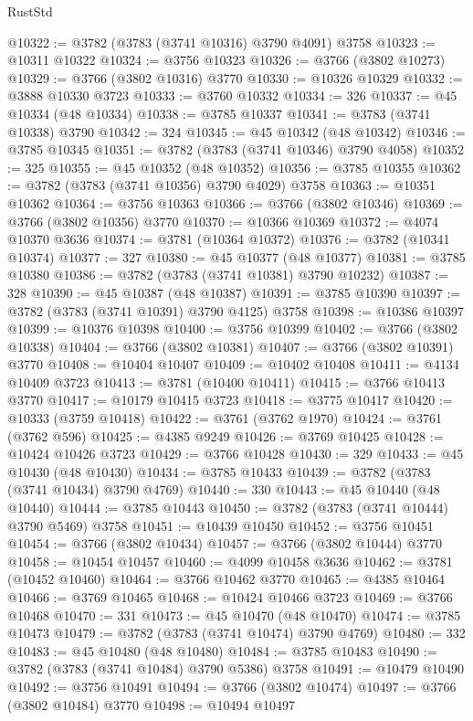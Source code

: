 \begin{lexlean}{RustStd}
\begin{coremodule}
@10322 := @3782 (@3783 (@3741 @10316) @3790 @4091) @3758
@10323 := @10311 @10322
@10324 := @3756 @10323
@10326 := @3766 (@3802 @10273)
@10329 := @3766 (@3802 @10316) @3770
@10330 := @10326 @10329
@10332 := @3888 @10330 @3723
@10333 := @3760 @10332
@10334 := 326
@10337 := @45 @10334 (@48 @10334)
@10338 := @3785 @10337
@10341 := @3783 (@3741 @10338) @3790
@10342 := 324
@10345 := @45 @10342 (@48 @10342)
@10346 := @3785 @10345
@10351 := @3782 (@3783 (@3741 @10346) @3790 @4058)
@10352 := 325
@10355 := @45 @10352 (@48 @10352)
@10356 := @3785 @10355
@10362 := @3782 (@3783 (@3741 @10356) @3790 @4029) @3758
@10363 := @10351 @10362
@10364 := @3756 @10363
@10366 := @3766 (@3802 @10346)
@10369 := @3766 (@3802 @10356) @3770
@10370 := @10366 @10369
@10372 := @4074 @10370 @3636
@10374 := @3781 (@10364 @10372)
@10376 := @3782 (@10341 @10374)
@10377 := 327
@10380 := @45 @10377 (@48 @10377)
@10381 := @3785 @10380
@10386 := @3782 (@3783 (@3741 @10381) @3790 @10232)
@10387 := 328
@10390 := @45 @10387 (@48 @10387)
@10391 := @3785 @10390
@10397 := @3782 (@3783 (@3741 @10391) @3790 @4125) @3758
@10398 := @10386 @10397
@10399 := @10376 @10398
@10400 := @3756 @10399
@10402 := @3766 (@3802 @10338)
@10404 := @3766 (@3802 @10381)
@10407 := @3766 (@3802 @10391) @3770
@10408 := @10404 @10407
@10409 := @10402 @10408
@10411 := @4134 @10409 @3723
@10413 := @3781 (@10400 @10411)
@10415 := @3766 @10413 @3770
@10417 := @10179 @10415 @3723
@10418 := @3775 @10417
@10420 := @10333 (@3759 @10418)
@10422 := @3761 (@3762 @1970)
@10424 := @3761 (@3762 @596)
@10425 := @4385 @9249
@10426 := @3769 @10425
@10428 := @10424 @10426 @3723
@10429 := @3766 @10428
@10430 := 329
@10433 := @45 @10430 (@48 @10430)
@10434 := @3785 @10433
@10439 := @3782 (@3783 (@3741 @10434) @3790 @4769)
@10440 := 330
@10443 := @45 @10440 (@48 @10440)
@10444 := @3785 @10443
@10450 := @3782 (@3783 (@3741 @10444) @3790 @5469) @3758
@10451 := @10439 @10450
@10452 := @3756 @10451
@10454 := @3766 (@3802 @10434)
@10457 := @3766 (@3802 @10444) @3770
@10458 := @10454 @10457
@10460 := @4099 @10458 @3636
@10462 := @3781 (@10452 @10460)
@10464 := @3766 @10462 @3770
@10465 := @4385 @10464
@10466 := @3769 @10465
@10468 := @10424 @10466 @3723
@10469 := @3766 @10468
@10470 := 331
@10473 := @45 @10470 (@48 @10470)
@10474 := @3785 @10473
@10479 := @3782 (@3783 (@3741 @10474) @3790 @4769)
@10480 := 332
@10483 := @45 @10480 (@48 @10480)
@10484 := @3785 @10483
@10490 := @3782 (@3783 (@3741 @10484) @3790 @5386) @3758
@10491 := @10479 @10490
@10492 := @3756 @10491
@10494 := @3766 (@3802 @10474)
@10497 := @3766 (@3802 @10484) @3770
@10498 := @10494 @10497

\end{coremodule}
\end{lexlean}
